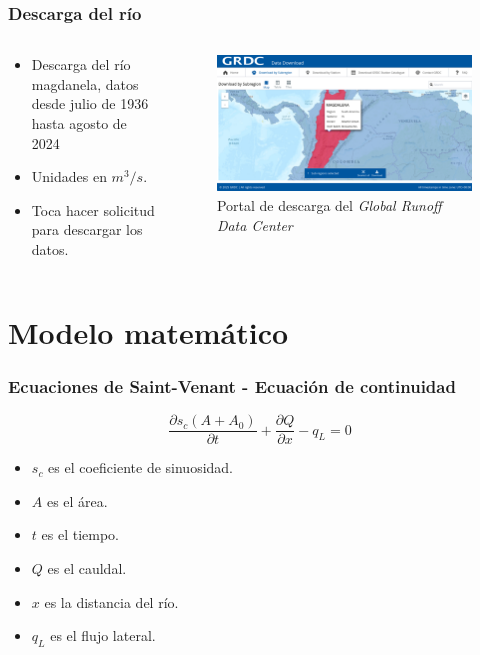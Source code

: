 \documentclass[17pt, t, lualatex]{beamer}
\begin{document}
\begin{frame}
  \frametitle{Descarga del río}

  \begin{columns}
    \begin{column}{.5\textwidth}
      \begin{itemize}
        \item Descarga del río magdanela, datos desde julio de 1936 hasta agosto de 2024 
        \item Unidades en $m^{3}/s$.
        \item Toca hacer solicitud para descargar los datos.
      \end{itemize}
    \end{column}

    \begin{column}{.5\textwidth}
      \begin{figure}[ht]
        \centering
        \includegraphics[width=1\textwidth]{img/GRDC.png}
        \caption{Portal de descarga del \textit{Global Runoff Data Center}\cite{grdc_data_portal}}
      \end{figure}
    \end{column}
  \end{columns}

\end{frame}



\section{Modelo matemático}

\insertsectionpage

\begin{frame}
  \frametitle{Ecuaciones de Saint-Venant - Ecuación de continuidad}
  \[
    \frac{\partial s_{c} (A + A_{0})}{\partial t} + \frac{\partial Q}{\partial x} - q_{L} = 0
  \]
  \begin{itemize}
    \item $s_{c}$ es el coeficiente de sinuosidad.
    \item $A$ es el área.
    \item $t$ es el tiempo.
    \item $Q$ es el cauldal.
    \item $x$ es la distancia del río.
    \item $q_{L}$ es el flujo lateral.
  \end{itemize}
\end{frame}
\end{document}
